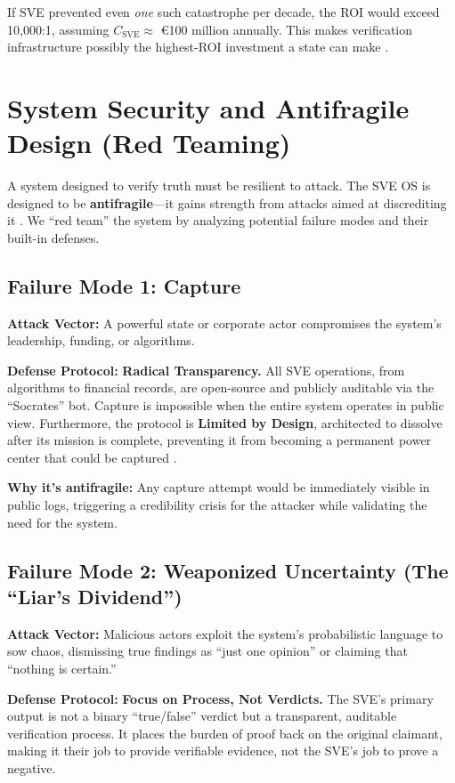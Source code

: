 \documentclass[11pt,a4paper]{article}
\begin{document}
If SVE prevented even \textit{one} such catastrophe per decade, the ROI would exceed 10,000:1, assuming $C_{\text{SVE}} \approx$ €100 million annually. This makes verification infrastructure possibly the highest-ROI investment a state can make \citep[lines 1514--1516, 1903--1906, 2140--2142, 3446--3448]{AnalyticalReport2025}.

\section{System Security and Antifragile Design (Red Teaming)}
A system designed to verify truth must be resilient to attack. The SVE OS is designed to be \textbf{antifragile}—it gains strength from attacks aimed at discrediting it \citep{Taleb2012}. We ``red team'' the system by analyzing potential failure modes and their built-in defenses.

\subsection{Failure Mode 1: Capture}
\textbf{Attack Vector:} A powerful state or corporate actor compromises the system's leadership, funding, or algorithms.

\textbf{Defense Protocol:} \textbf{Radical Transparency.} All SVE operations, from algorithms to financial records, are open-source and publicly auditable via the ``Socrates'' bot. Capture is impossible when the entire system operates in public view. Furthermore, the protocol is \textbf{Limited by Design}, architected to dissolve after its mission is complete, preventing it from becoming a permanent power center that could be captured \citep[lines 1916--1920, 3497--3498]{AnalyticalReport2025}.

\textbf{Why it's antifragile:} Any capture attempt would be immediately visible in public logs, triggering a credibility crisis for the attacker while validating the need for the system.

\subsection{Failure Mode 2: Weaponized Uncertainty (The ``Liar's Dividend'')}
\textbf{Attack Vector:} Malicious actors exploit the system's probabilistic language to sow chaos, dismissing true findings as ``just one opinion'' or claiming that ``nothing is certain.''

\textbf{Defense Protocol:} \textbf{Focus on Process, Not Verdicts.} The SVE's primary output is not a binary ``true/false'' verdict but a transparent, auditable verification process. It places the burden of proof back on the original claimant, making it their job to provide verifiable evidence, not the SVE's job to prove a negative.
\end{document}
